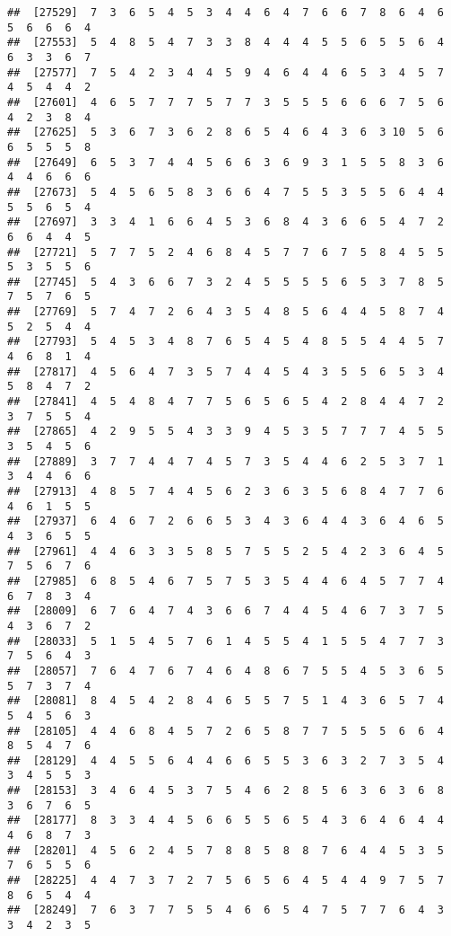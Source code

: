 \documentclass[
]{book}
\begin{document}
\begin{verbatim}
##  [27529]  7  3  6  5  4  5  3  4  4  6  4  7  6  6  7  8  6  4  6  5  6  6  6  4
##  [27553]  5  4  8  5  4  7  3  3  8  4  4  4  5  5  6  5  5  6  4  6  3  3  6  7
##  [27577]  7  5  4  2  3  4  4  5  9  4  6  4  4  6  5  3  4  5  7  4  5  4  4  2
##  [27601]  4  6  5  7  7  7  5  7  7  3  5  5  5  6  6  6  7  5  6  4  2  3  8  4
##  [27625]  5  3  6  7  3  6  2  8  6  5  4  6  4  3  6  3 10  5  6  6  5  5  5  8
##  [27649]  6  5  3  7  4  4  5  6  6  3  6  9  3  1  5  5  8  3  6  4  4  6  6  6
##  [27673]  5  4  5  6  5  8  3  6  6  4  7  5  5  3  5  5  6  4  4  5  5  6  5  4
##  [27697]  3  3  4  1  6  6  4  5  3  6  8  4  3  6  6  5  4  7  2  6  6  4  4  5
##  [27721]  5  7  7  5  2  4  6  8  4  5  7  7  6  7  5  8  4  5  5  5  3  5  5  6
##  [27745]  5  4  3  6  6  7  3  2  4  5  5  5  5  6  5  3  7  8  5  7  5  7  6  5
##  [27769]  5  7  4  7  2  6  4  3  5  4  8  5  6  4  4  5  8  7  4  5  2  5  4  4
##  [27793]  5  4  5  3  4  8  7  6  5  4  5  4  8  5  5  4  4  5  7  4  6  8  1  4
##  [27817]  4  5  6  4  7  3  5  7  4  4  5  4  3  5  5  6  5  3  4  5  8  4  7  2
##  [27841]  4  5  4  8  4  7  7  5  6  5  6  5  4  2  8  4  4  7  2  3  7  5  5  4
##  [27865]  4  2  9  5  5  4  3  3  9  4  5  3  5  7  7  7  4  5  5  3  5  4  5  6
##  [27889]  3  7  7  4  4  7  4  5  7  3  5  4  4  6  2  5  3  7  1  3  4  4  6  6
##  [27913]  4  8  5  7  4  4  5  6  2  3  6  3  5  6  8  4  7  7  6  4  6  1  5  5
##  [27937]  6  4  6  7  2  6  6  5  3  4  3  6  4  4  3  6  4  6  5  4  3  6  5  5
##  [27961]  4  4  6  3  3  5  8  5  7  5  5  2  5  4  2  3  6  4  5  7  5  6  7  6
##  [27985]  6  8  5  4  6  7  5  7  5  3  5  4  4  6  4  5  7  7  4  6  7  8  3  4
##  [28009]  6  7  6  4  7  4  3  6  6  7  4  4  5  4  6  7  3  7  5  4  3  6  7  2
##  [28033]  5  1  5  4  5  7  6  1  4  5  5  4  1  5  5  4  7  7  3  7  5  6  4  3
##  [28057]  7  6  4  7  6  7  4  6  4  8  6  7  5  5  4  5  3  6  5  5  7  3  7  4
##  [28081]  8  4  5  4  2  8  4  6  5  5  7  5  1  4  3  6  5  7  4  5  4  5  6  3
##  [28105]  4  4  6  8  4  5  7  2  6  5  8  7  7  5  5  5  6  6  4  8  5  4  7  6
##  [28129]  4  4  5  5  6  4  4  6  6  5  5  3  6  3  2  7  3  5  4  3  4  5  5  3
##  [28153]  3  4  6  4  5  3  7  5  4  6  2  8  5  6  3  6  3  6  8  3  6  7  6  5
##  [28177]  8  3  3  4  4  5  6  6  5  5  6  5  4  3  6  4  6  4  4  4  6  8  7  3
##  [28201]  4  5  6  2  4  5  7  8  8  5  8  8  7  6  4  4  5  3  5  7  6  5  5  6
##  [28225]  4  4  7  3  7  2  7  5  6  5  6  4  5  4  4  9  7  5  7  8  6  5  4  4
##  [28249]  7  6  3  7  7  5  5  4  6  6  5  4  7  5  7  7  6  4  3  3  4  2  3  5

\end{verbatim}
\end{document}
